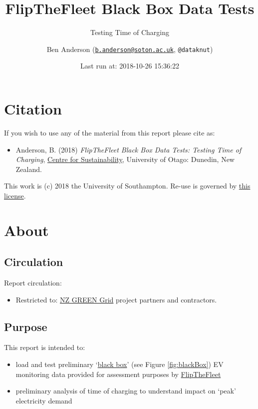\documentclass[]{article}
\title{FlipTheFleet Black Box Data Tests}
\subtitle{Testing Time of Charging}
\author{Ben Anderson
(\href{mailto:b.anderson@soton.ac.uk}{\nolinkurl{b.anderson@soton.ac.uk}},
\texttt{@dataknut})}
\date{Last run at: 2018-10-26 15:36:22}
\providecommand{\tightlist}{%
  \setlength{\itemsep}{0pt}\setlength{\parskip}{0pt}}
\begin{document}
\maketitle

{
\setcounter{tocdepth}{2}
\tableofcontents
}
\newpage

\section{Citation}\label{citation}

If you wish to use any of the material from this report please cite as:

\begin{itemize}
\tightlist
\item
  Anderson, B. (2018) \emph{FlipTheFleet Black Box Data Tests: Testing
  Time of Charging},
  \href{http://www.otago.ac.nz/centre-sustainability/}{Centre for
  Sustainability}, University of Otago: Dunedin, New Zealand.
\end{itemize}

This work is (c) 2018 the University of Southampton. Re-use is governed
by \href{https://github.com/CfSOtago/GREENGrid/blob/master/LICENSE}{this
license}.

\newpage

\section{About}\label{about}

\subsection{Circulation}\label{circulation}

Report circulation:

\begin{itemize}
\tightlist
\item
  Restricted to:
  \href{https://www.otago.ac.nz/centre-sustainability/research/energy/otago050285.html}{NZ
  GREEN Grid} project partners and contractors.
\end{itemize}

\subsection{Purpose}\label{purpose}

This report is intended to:

\begin{itemize}
\tightlist
\item
  load and test preliminary
  `\href{https://flipthefleet.org/ev-black-box/}{black box}' (see Figure
  \ref{fig:blackBox}) EV monitoring data provided for assessment
  purposes by \href{http://flipthefleet.org/}{FlipTheFleet}
\item
  preliminary analysis of time of charging to understand impact on
  `peak' electricity demand
\end{itemize}
\end{document}
